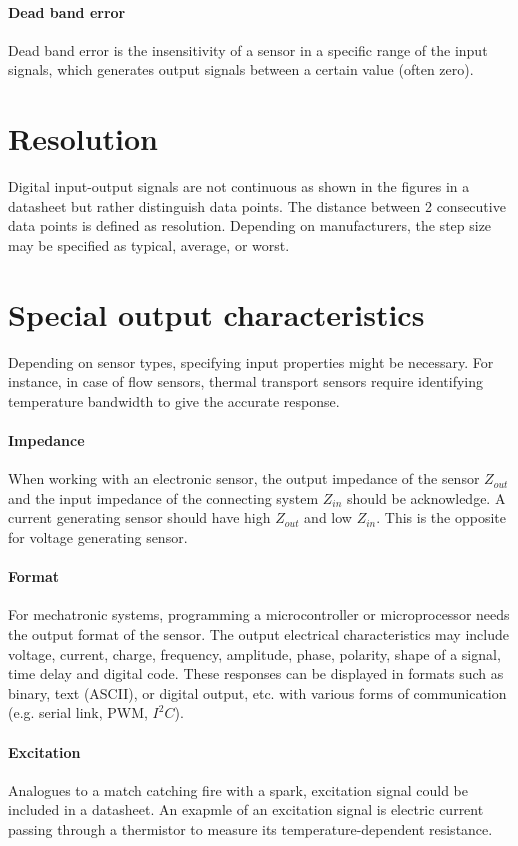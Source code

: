 \paragraph{Dead band error}
Dead band error is the insensitivity of a sensor in a specific range of the input signals, which generates output signals between a certain value (often zero).
\section{Resolution}
Digital input-output signals are not continuous as shown in the figures in a datasheet but rather distinguish data points. The distance between 2 consecutive data points is defined as resolution. Depending on manufacturers, the step size may be specified as typical, average, or worst.
\section{Special output characteristics}
Depending on sensor types, specifying input properties might be necessary. For instance, in case of flow sensors, thermal transport sensors require identifying temperature bandwidth to give the accurate response.
\paragraph{Impedance}
When working with an electronic sensor, the output impedance of the sensor $ Z_{out} $ and the input impedance of the connecting system $ Z_{in} $ should be acknowledge. A current generating sensor should have high $ Z_{out} $ and low $ Z_{in} $. This is the opposite for voltage generating sensor.
\paragraph{Format}
For mechatronic systems, programming a microcontroller or microprocessor needs the output format of the sensor. The output electrical characteristics may include voltage, current, charge, frequency, amplitude, phase, polarity, shape of a signal, time delay and digital code. These responses can be displayed in formats such as binary, text (ASCII), or digital output, etc. with various forms of communication (e.g. serial link, PWM, $ I^2C $).
\paragraph{Excitation}
Analogues to a match catching fire with a spark, excitation signal could be included in a datasheet. An exapmle of an excitation signal is electric current passing through a thermistor to measure its temperature-dependent resistance.
